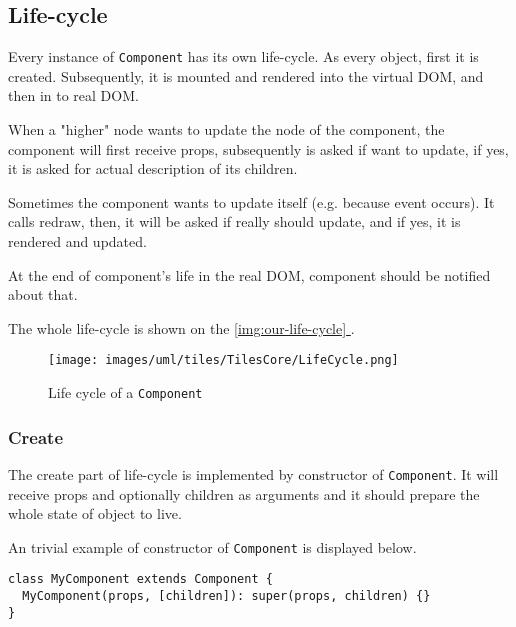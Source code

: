 \documentclass[oneside, 12pt]{book}
\newcommand*{\fullref}[1]{\hyperref[{#1}]{\autoref*{#1} \nameref*{#1}}}
\begin{document}
  \subsection{Life-cycle}\label{subsec:our-architecture-lifecycle}

    Every instance of \texttt{Component} has its own life-cycle. 
    As every object, first it is created. 
    Subsequently, it is mounted and rendered into the virtual DOM, and then in to real DOM.

    When a "higher" node wants to update the node of the component, 
		the component will first receive props, 
		subsequently is asked if want to update, 
		if yes, it is asked for actual description of its children. 

    Sometimes the component wants to update itself (e.g. because event occurs).
    It calls redraw, then, it will be asked if really should update, and if yes, it is rendered and updated.

    At the end of component's life in the real DOM, 
    component should be notified about that.

    The whole life-cycle is shown on the \fullref{img:our-life-cycle}.

    \begin{figure}[h]
    \centering  
      \texttt{[image: images/uml/tiles/TilesCore/LifeCycle.png]}
      \caption{Life cycle of a \texttt{Component}}
      \label{img:our-life-cycle}
    \end{figure}

    \subsubsection{Create}\label{subsec:our-architecture-lifecycle-create}

      The create part of life-cycle is implemented by constructor of \texttt{Component}. 
      It will receive props and optionally children as arguments and 
      it should prepare the whole state of object to live.

      An trivial example of constructor of \texttt{Component} is displayed below.
      \begin{verbatim}
class MyComponent extends Component {
  MyComponent(props, [children]): super(props, children) {}
}
      \end{verbatim}

\end{document}
